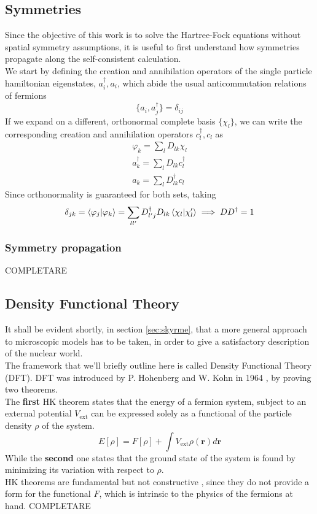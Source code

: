 \subsection{Symmetries}
Since the objective of this work is to solve the Hartree-Fock equations without spatial symmetry assumptions, it is useful to first understand how symmetries propagate along the self-consistent calculation.
\\We start by defining the creation and annihilation operators of the single particle hamiltonian eigenstates, $a_i^\dagger, a_i$, which abide the usual anticommutation relations of fermions
\begin{equation}
    \label{eq:fermion_anticommutations}
    \{a_i, a_j^\dagger\} = \delta_{ij}
\end{equation}
If we expand on a different, orthonormal complete basis $\{\chi_l\}$, we can write the corresponding creation and annihilation operators $c_l^\dagger, c_l$ as
\begin{align}
    \label{eq:basis_change}
    \varphi_k = \sum_l D_{lk} \chi_l\\
    a_k^\dagger = \sum_l D_{lk} c_l^\dagger\\
    a_k = \sum_l D_{lk}^\dagger c_l
\end{align}
Since orthonormality is guaranteed for both sets, taking 
\begin{equation}
    \delta_{jk} = \bra{\varphi_j}\ket{\varphi_k} = \sum_{ll'} D_{l'j}^\dagger D_{lk}\bra{\chi_l}\ket{\chi_l'}\implies DD^\dagger = 1
\end{equation}
\subsubsection{Symmetry propagation}
COMPLETARE
\subsection{Density Functional Theory}
It shall be evident shortly, in section \ref{sec:skyrme}, that a more general approach to microscopic models has to be taken, in order to give a satisfactory description of the nuclear world.
\\The framework that we'll briefly outline here is called Density Functional Theory (DFT). DFT was introduced by P. Hohenberg and W. Kohn in 1964 \cite{HK}, by proving two theorems.
\\The \textbf{first} HK theorem states that the energy of a fermion system, subject to an external potential $V_\text{ext}$ can be expressed solely as a functional of the particle density $\rho$ of the system.
\begin{equation}
    \label{eq:hk_theorem1}
    E[\rho] = F[\rho] + \int V_\text{ext} \rho(\bm r) d\mathbf r
\end{equation}
While the \textbf{second} one states that the ground state of the system is found by minimizing its variation with respect to $\rho$. 
\\HK theorems are fundamental but not constructive \cite{NDFT}, since they do not provide a form for the functional $F$, which is intrinsic to the physics of the fermions at hand.
COMPLETARE



